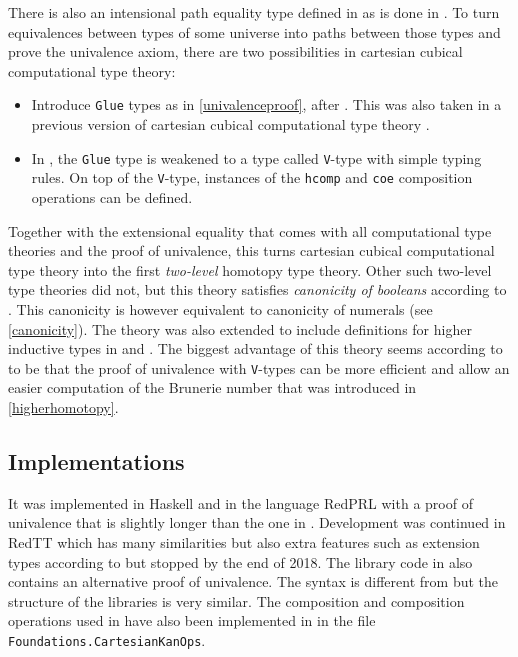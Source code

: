 \documentclass[12pt,a4paper,twoside,xetex]{book} %
\newcommand{\keyword}[1]{\emph{#1}\index{#1}}
\begin{document}
There is also an intensional path equality type defined in \cite{Angiuli2018} as 
is done in \cite{Huber2016}. To turn equivalences between types of some universe 
into paths between those types and prove the univalence axiom, there are two 
possibilities in cartesian cubical computational type theory:

\begin{itemize}
 \item Introduce \texttt{Glue} types as in \cref{univalenceproof}, after 
\cite{Huber2016}. This was also taken in a previous version of cartesian cubical 
computational type theory \cite{Angiuli2017}.
 \item In \cite{Angiuli2018}, the \texttt{Glue} type is weakened to a type 
called \texttt{V}-type with simple typing rules. On top of the \texttt{V}-type, 
instances of the \texttt{hcomp} and \texttt{coe} composition operations can be 
defined.
\end{itemize}


Together with the extensional equality that comes with all computational type 
theories and the proof of univalence, this turns cartesian cubical computational 
type theory into the first \keyword{two-level} homotopy type theory. Other such 
two-level type theories did not, but this theory satisfies \keyword{canonicity 
of booleans} according to \cite{Angiuli2018}. This canonicity is however 
equivalent to canonicity of numerals (see \cref{canonicity}). The theory was 
also extended to include definitions for higher inductive types in 
\cite{CavHar18} and \cite{CaHa19}. The biggest advantage of this theory seems 
according to \cite{Moertberg2018Bonn} to be that the proof of univalence with 
\texttt{V}-types can be more efficient and allow an easier computation of the 
Brunerie number that was introduced in \cref{higherhomotopy}.

\subsection{Implementations}

It was implemented in Haskell \cite{MorAng18} and in the language RedPRL 
\cite{Sterling2018a} with a proof of univalence that is slightly longer than the 
one in \cite{Moertberg2018}. Development was continued in RedTT 
\cite{Sterling2018b} which has many similarities but also extra features such as 
extension types according to \cite{Moertberg2018a} but stopped by the end of 
2018. The library code in \cite{Sterling2018b} also contains an alternative 
proof of univalence. The syntax is different from \cite{Moertberg2018} but the 
structure of the libraries is very similar. The composition and composition 
operations used in \cite{Sterling2018b} have also been implemented in 
\cite{Moertberg2018} in the file \texttt{Foundations.CartesianKanOps}. 
\end{document}
